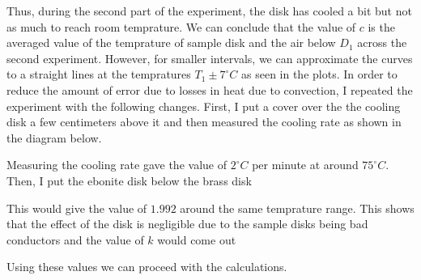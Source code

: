 \documentclass[12pt]{article}
\begin{document}
Thus, during the second part of the experiment, the disk has cooled a bit but not as much to reach room temprature.
We can conclude that the value of $c$ is the averaged value of the temprature of sample disk and the air below $D_1$ across the second experiment.
However, for smaller intervals, we can approximate the curves to a straight lines at the tempratures $T_1 \pm 7^\circ C$ as seen in the plots.
In order to reduce the amount of error due to losses in heat due to convection, I repeated the experiment with the following changes.
First, I put a cover over the the cooling disk a few centimeters above it and then measured the cooling rate as shown in the diagram below.
\begin{center}
\end{center}
Measuring the cooling rate gave the value of $2^\circ C$ per minute at around $75^\circ C$.
Then, I put the ebonite disk below the brass disk
\begin{center}
\end{center}
This would give the value of $1.992$ around the same temprature range.
This shows that the effect of the disk is negligible due to the sample disks being bad conductors and the value of $k$ would come out

Using these values we can proceed with the calculations.
\end{document}
